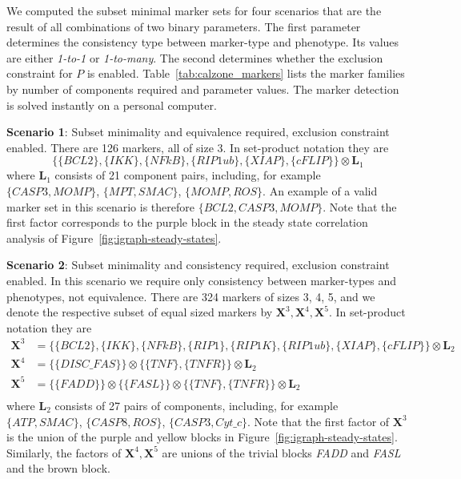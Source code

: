 \documentclass[11pt]{article}
\begin{document}
    We computed the subset minimal marker sets for four scenarios that are the result of all combinations of two binary parameters.
    The first parameter determines the consistency type between marker-type and phenotype.
    Its values are either \textit{1-to-1} or \textit{1-to-many}.
    The second determines whether the exclusion constraint for $P$ is enabled.
    Table~\ref{tab:calzone_markers} lists the marker families by number of components required and parameter values.
    The marker detection is solved instantly on a personal computer.

    \textbf{Scenario 1}: Subset minimality and equivalence required, exclusion constraint enabled.
    There are 126 markers, all of size 3.
    In set-product notation they are
    \[
        \{\{BCL2\},\{IKK\},\{NFkB\},\{RIP1ub\},\{XIAP\},\{cFLIP\}\} \otimes \mathbf L_1
    \]
    where $\mathbf L_1$ consists of 21 component pairs, including, for example $\{CASP3,MOMP\}$, $\{MPT,SMAC\}$, $\{MOMP,ROS\}$.
    An example of a valid marker set in this scenario is therefore $\{BCL2,CASP3,MOMP\}$.
    Note that the first factor corresponds to the purple block in the steady state correlation analysis of Figure~\ref{fig:igraph-steady-states}.


    \textbf{Scenario 2}: Subset minimality and consistency required, exclusion constraint enabled.
    In this scenario we require only consistency between marker-types and phenotypes, not equivalence.
    There are 324 markers of sizes 3, 4, 5, and we denote the respective subset of equal sized markers by $\mathbf X^3, \mathbf X^4, \mathbf X^5$.
    In set-product notation they are
    \begin{align*}
        \mathbf X^3 &= \{\{BCL2\},\{IKK\},\{NFkB\},\{RIP1\},\{RIP1K\},\{RIP1ub\},\{XIAP\},\{cFLIP\}\} \otimes \mathbf L_2\\
        \mathbf X^4 &= \{\{DISC\_FAS\}\} \otimes \{\{TNF\},\{TNFR\}\} \otimes \mathbf L_2\\
        \mathbf X^5 &= \{\{FADD\}\} \otimes \{\{FASL\}\} \otimes \{\{TNF\},\{TNFR\}\} \otimes \mathbf L_2\\
    \end{align*}
    where $\mathbf L_2$ consists of 27 pairs of components, including, for example $\{ATP,SMAC\}$, $\{CASP8,ROS\}$, $\{CASP3,Cyt\_c\}$.
    Note that the first factor of $\mathbf X^3$ is the union of the purple and yellow blocks in Figure~\ref{fig:igraph-steady-states}.
    Similarly, the factors of $\mathbf X^4, \mathbf X^5$ are unions of the trivial blocks \emph{FADD} and \emph{FASL} and the brown block.
\end{document}
